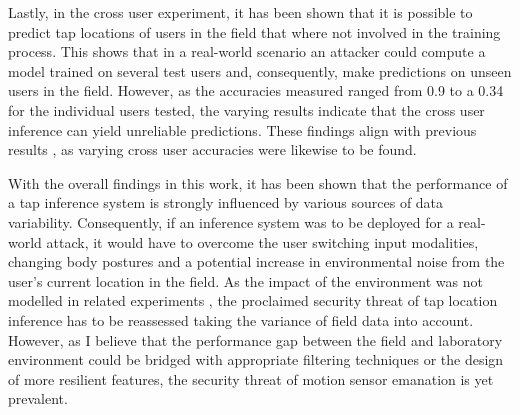Lastly, in the cross user experiment, it has been shown that it is possible to predict tap locations of users in the field that where not involved in the training process. This shows that in a real-world scenario an attacker could compute a model trained on several test users and, consequently, make predictions on unseen users in the field. However, as the accuracies measured ranged from 0.9 to a 0.34 for the individual users tested, the varying results indicate that the cross user inference can yield unreliable predictions. These findings align with previous results \cite{Tapprints}, as varying cross user accuracies were likewise to be found.

With the overall findings in this work, it has been shown that the performance of a tap inference system is strongly influenced by various sources of data variability. Consequently, if an inference system was to be deployed for a real-world attack, it would have to overcome the user switching input modalities, changing body postures and a potential increase in environmental noise from the user's current location in the field. As the impact of the environment was not modelled in related experiments \cite{Tapprints,Touchlogger,Accessory}, the proclaimed security threat of tap location inference has to be reassessed taking the variance of field data into account. However, as I believe that the performance gap between the field and laboratory environment could be bridged with appropriate filtering techniques or the design of more resilient features, the security threat of motion sensor emanation is yet prevalent.





